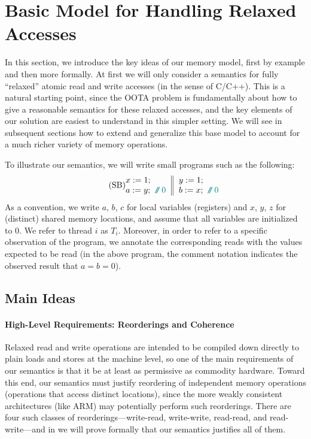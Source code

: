 \section{Basic Model for Handling Relaxed Accesses}
\label{sec:relaxed}

In this section, we introduce the key ideas of our memory model, first
by example and then more formally.  At first we will only consider a
semantics for fully ``relaxed'' atomic read and write accesses (in the
sense of C/C++).  This is a natural starting point, since the OOTA
problem is fundamentally about how to give a reasonable semantics for
these relaxed accesses, and the key elements of our solution are
easiest to understand in this simpler setting.  We will see in
subsequent sections how to extend and generalize this base model to
account for a much richer variety of memory operations.

To illustrate our semantics, we will write small programs such as the
following:
\begin{equation}\label{eq:SB}\tag{SB}
\inarrII{x:=1;\\a:=y;\comment{0}}{y:=1;\\b:=x;\comment{0}}
\end{equation}
As a convention, we write $a$, $b$, $c$ for local variables
(registers) and $x$, $y$, $z$ for (distinct) shared memory locations,
and assume that all variables are initialized to $0$.  
We refer to thread $i$ as $T_i$.  Moreover, in order to
refer to a specific observation of the program, we annotate the
corresponding reads with the values expected to be read (\eg in the
above program, the comment notation indicates the observed result that
$a = b = 0$).

\subsection{Main Ideas}

\paragraph{High-Level Requirements: Reorderings and Coherence}

Relaxed read and write operations are intended to be compiled down
directly to plain loads and stores at the machine level, so one of the
main requirements of our semantics is that it be at least as
permissive as commodity hardware.  Toward this end, our semantics must
justify reordering of independent memory operations (\ie operations
that access distinct locations), since the more weakly consistent
architectures (like ARM) may potentially perform such reorderings.
There are four such classes of reorderings---write-read, write-write,
read-read, and read-write---and in  we will prove formally
that our semantics justifies all of them.

